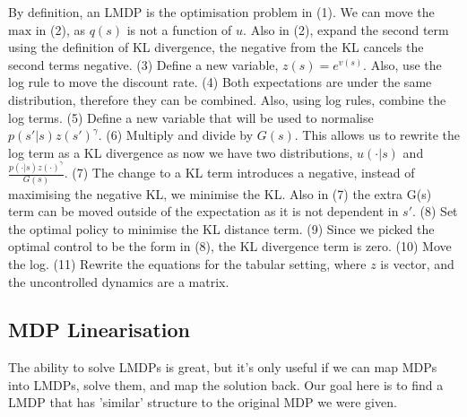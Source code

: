 By definition, an LMDP is the optimisation problem in (1). We can move the $\text{max}$ in (2), as $q(s)$ is not a function of $u$. Also in (2), expand the second term using the definition of KL divergence, the negative from the KL cancels the second terms negative. (3) Define a new variable, $z(s) = e^{v(s)}$. Also, use the log rule to move the discount rate. (4) Both expectations are under the same distribution, therefore they can be combined. Also, using log rules, combine the log terms. (5) Define a new variable that will be used to normalise $p(s' | s)z(s')^{\gamma}$. (6) Multiply and divide by $G(s)$. This allows us to rewrite the log term as a KL divergence as now we have two distributions, $u(\cdot | s)$ and $\frac{p(\cdot | s)z(\cdot)^{\gamma}}{G(s)}$. (7) The change to a KL term introduces a negative, instead of maximising the negative KL, we minimise the KL. Also in (7) the extra G(s) term can be moved outside of the expectation as it is not dependent in $s'$. (8) Set the optimal policy to minimise the KL distance term. (9) Since we picked the optimal control to be the form in (8), the KL divergence term is zero. (10) Move the log. (11) Rewrite the equations for the tabular setting, where $z$ is vector, and the uncontrolled dynamics are a matrix.

\subsection{MDP Linearisation}\label{mdp-Linearisation}

The ability to solve LMDPs is great, but it's only useful if we can map MDPs into LMDPs, solve them, and map the solution back.
Our goal here is to find a LMDP that has 'similar' structure to the original MDP we were given.\footnotemark[1]


